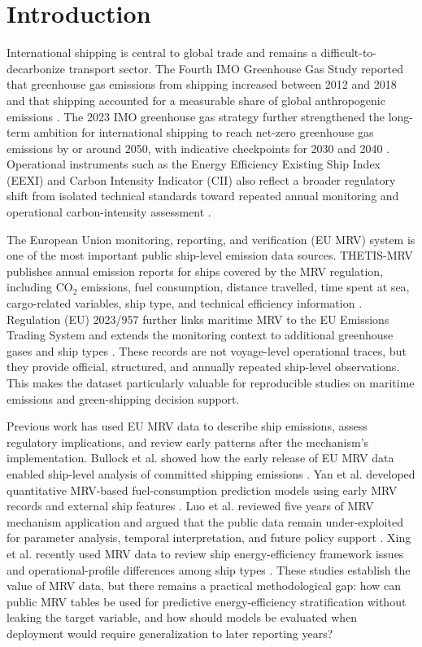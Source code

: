 \documentclass[preprints,article,submit,pdftex,oneauthor]{Definitions/mdpi}
\begin{document}
\section{Introduction}

International shipping is central to global trade and remains a difficult-to-decarbonize transport sector. The Fourth IMO Greenhouse Gas Study reported that greenhouse gas emissions from shipping increased between 2012 and 2018 and that shipping accounted for a measurable share of global anthropogenic emissions \cite{imo_fourth_ghg_study_2020}. The 2023 IMO greenhouse gas strategy further strengthened the long-term ambition for international shipping to reach net-zero greenhouse gas emissions by or around 2050, with indicative checkpoints for 2030 and 2040 \cite{imo_2023_ghg_strategy}. Operational instruments such as the Energy Efficiency Existing Ship Index (EEXI) and Carbon Intensity Indicator (CII) also reflect a broader regulatory shift from isolated technical standards toward repeated annual monitoring and operational carbon-intensity assessment \cite{imo_eexi_cii_faq}.

The European Union monitoring, reporting, and verification (EU MRV) system is one of the most important public ship-level emission data sources. THETIS-MRV publishes annual emission reports for ships covered by the MRV regulation, including CO$_2$ emissions, fuel consumption, distance travelled, time spent at sea, cargo-related variables, ship type, and technical efficiency information \cite{emsa_thetis_mrv,ec_2024_mrv_report,regulation_eu_2015_757}. Regulation (EU) 2023/957 further links maritime MRV to the EU Emissions Trading System and extends the monitoring context to additional greenhouse gases and ship types \cite{regulation_eu_2023_957}. These records are not voyage-level operational traces, but they provide official, structured, and annually repeated ship-level observations. This makes the dataset particularly valuable for reproducible studies on maritime emissions and green-shipping decision support.

Previous work has used EU MRV data to describe ship emissions, assess regulatory implications, and review early patterns after the mechanism's implementation. Bullock et al. showed how the early release of EU MRV data enabled ship-level analysis of committed shipping emissions \cite{bullock2020shipping_paris}. Yan et al. developed quantitative MRV-based fuel-consumption prediction models using early MRV records and external ship features \cite{yan2023mrv_energy_efficiency}. Luo et al. reviewed five years of MRV mechanism application and argued that the public data remain under-exploited for parameter analysis, temporal interpretation, and future policy support \cite{luo2024mrv_review}. Xing et al. recently used MRV data to review ship energy-efficiency framework issues and operational-profile differences among ship types \cite{xing2025mrv_efficiency_framework}. These studies establish the value of MRV data, but there remains a practical methodological gap: how can public MRV tables be used for predictive energy-efficiency stratification without leaking the target variable, and how should models be evaluated when deployment would require generalization to later reporting years?
\end{document}
